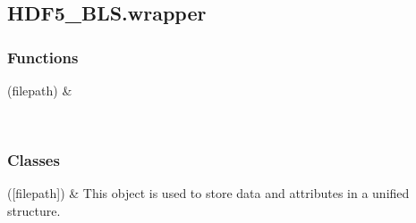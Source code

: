 \documentclass[letterpaper,10pt,english]{sphinxmanual}
\begin{document}
\sphinxstepscope


\subsection{HDF5\_BLS.wrapper}
\label{\detokenize{_autosummary/HDF5_BLS.wrapper:module-HDF5_BLS.wrapper}}\label{\detokenize{_autosummary/HDF5_BLS.wrapper:hdf5-bls-wrapper}}\label{\detokenize{_autosummary/HDF5_BLS.wrapper::doc}}\subsubsection*{Functions}


\begin{savenotes}\sphinxattablestart
\sphinxthistablewithglobalstyle
\sphinxthistablewithnovlinesstyle
\centering
\begin{tabulary}{\linewidth}[t]{}
\sphinxtoprule
\sphinxtableatstartofbodyhook
\sphinxAtStartPar
{\hyperref[\detokenize{_autosummary/HDF5_BLS.wrapper:HDF5_BLS.wrapper.is_tempfile}]{}}(filepath)
&
\sphinxAtStartPar

\\
\sphinxbottomrule
\end{tabulary}
\sphinxtableafterendhook\par
\sphinxattableend\end{savenotes}
\subsubsection*{Classes}


\begin{savenotes}\sphinxattablestart
\sphinxthistablewithglobalstyle
\sphinxthistablewithnovlinesstyle
\centering
\begin{tabulary}{\linewidth}[t]{}
\sphinxtoprule
\sphinxtableatstartofbodyhook
\sphinxAtStartPar
{\hyperref[\detokenize{_autosummary/HDF5_BLS.wrapper:HDF5_BLS.wrapper.Wrapper}]{}}({[}filepath{]})
&
\sphinxAtStartPar
This object is used to store data and attributes in a unified structure.
\\
\sphinxbottomrule
\end{tabulary}
\sphinxtableafterendhook\par
\sphinxattableend\end{savenotes}
\end{document}
